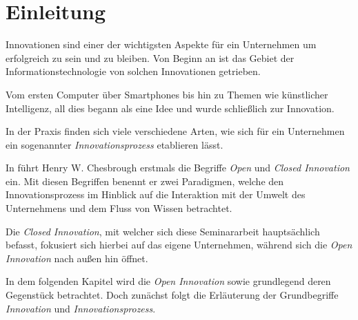 \section{Einleitung}\label{sec:einleitung}

Innovationen sind einer der wichtigsten Aspekte für ein Unternehmen um erfolgreich zu sein und zu bleiben.
Von Beginn an ist das Gebiet der Informationstechnologie von solchen Innovationen getrieben.

Vom ersten Computer über Smartphones bis hin zu Themen wie künstlicher Intelligenz,
all dies begann als eine Idee und wurde schließlich zur Innovation.

In der Praxis finden sich viele verschiedene Arten,
wie sich für ein Unternehmen ein sogenannter \textit{Innovationsprozess} etablieren lässt.

In \cite{chesbrough2003} führt Henry W. Chesbrough erstmals die Begriffe \textit{Open} und
\textit{Closed Innovation} ein.
Mit diesen Begriffen benennt er zwei Paradigmen, welche den Innovationsprozess im Hinblick auf die
Interaktion mit der Umwelt des Unternehmens und dem Fluss von Wissen betrachtet.

Die \textit{Closed Innovation}, mit welcher sich diese Seminararbeit hauptsächlich befasst,
fokusiert sich hierbei auf das eigene Unternehmen, während sich die \textit{Open Innovation}
nach außen hin öffnet.

In dem folgenden Kapitel wird die \textit{Open Innovation} sowie grundlegend deren Gegenstück betrachtet.
Doch zunächst folgt die Erläuterung der Grundbegriffe \textit{Innovation} und \textit{Innovationsprozess}.